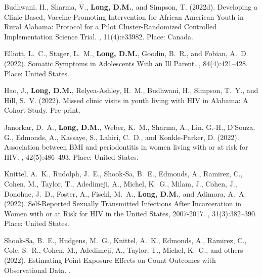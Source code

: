 \begin{thebibliography}{}
Budhwani, H., Sharma, V., \textbf{Long, D.M.}, and Simpson, T. (2022d).
\newblock Developing a {Clinic}-{Based}, {Vaccine}-{Promoting} {Intervention}
  for {African} {American} {Youth} in {Rural} {Alabama}: {Protocol} for a
  {Pilot} {Cluster}-{Randomized} {Controlled} {Implementation} {Science}
  {Trial}.
, 11(4):e33982.
\newblock Place: Canada.

Elliott, L.~C., Stager, L.~M., \textbf{Long, D.M.}, Goodin, B.~R., and Fobian, A.~D.
  (2022).
\newblock Somatic {Symptoms} in {Adolescents} {With} an {Ill} {Parent}.
, 84(4):421--428.
\newblock Place: United States.

Hao, J., \textbf{Long, D.M.}, Relyea-Ashley, H.~M., Budhwani, H., Simpson, T.~Y., and
  Hill, S.~V. (2022).
\newblock Missed clinic visits in youth living with {HIV} in {Alabama}: {A}
  {Cohort} {Study}.
\newblock Pre-print.

Janorkar, D.~A., \textbf{Long, D.M.}, Weber, K.~M., Sharma, A., Lin, G.-H., D'Souza,
  G., Edmonds, A., Kassaye, S., Lahiri, C.~D., and Konkle-Parker, D. (2022).
\newblock Association between {BMI} and periodontitis in women living with or
  at risk for {HIV}.
,
  42(5):486--493.
\newblock Place: United States.

Knittel, A.~K., Rudolph, J.~E., Shook-Sa, B.~E., Edmonds, A., Ramirez, C.,
  Cohen, M., Taylor, T., Adedimeji, A., Michel, K.~G., Milam, J., Cohen, J.,
  Donohue, J.~D., Foster, A., Fischl, M.~A., \textbf{Long, D.M.}, and Adimora, A.~A.
  (2022).
\newblock Self-{Reported} {Sexually} {Transmitted} {Infections} {After}
  {Incarceration} in {Women} with or at {Risk} for {HIV} in the {United}
  {States}, 2007-2017.
, 31(3):382--390.
\newblock Place: United States.

Shook-Sa, B.~E., Hudgens, M.~G., Knittel, A.~K., Edmonds, A., Ramirez, C.,
  Cole, S.~R., Cohen, M., Adedimeji, A., Taylor, T., Michel, K.~G., and
  {others} (2022).
\newblock Estimating {Point} {Exposure} {Effects} on {Count} {Outcomes} with
  {Observational} {Data}.
.


\end{thebibliography}
